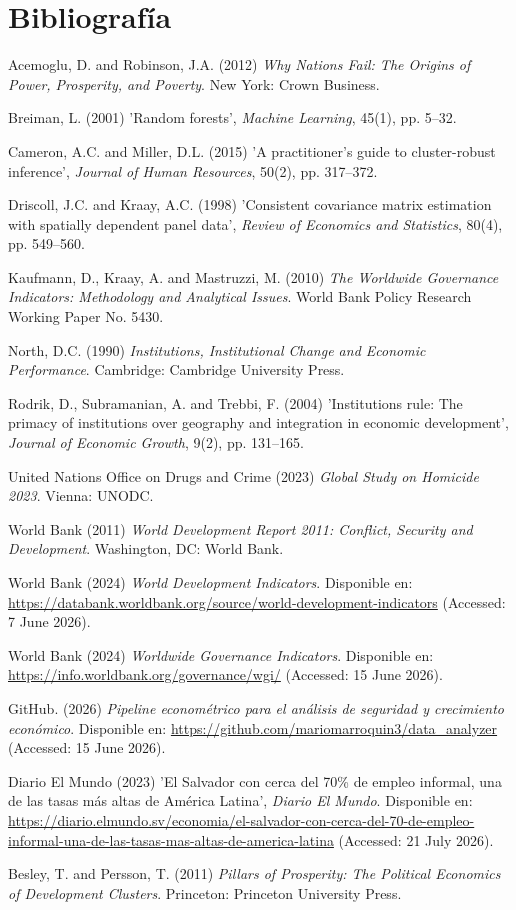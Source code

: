 \documentclass[11pt,a4paper]{article}
\begin{document}
\section*{Bibliografía}

Acemoglu, D. and Robinson, J.A. (2012) \textit{Why Nations Fail: The Origins of Power, Prosperity, and Poverty}. New York: Crown Business.

Breiman, L. (2001) 'Random forests', \textit{Machine Learning}, 45(1), pp. 5--32.

Cameron, A.C. and Miller, D.L. (2015) 'A practitioner's guide to cluster-robust inference', \textit{Journal of Human Resources}, 50(2), pp. 317--372.

Driscoll, J.C. and Kraay, A.C. (1998) 'Consistent covariance matrix estimation with spatially dependent panel data', \textit{Review of Economics and Statistics}, 80(4), pp. 549--560.

Kaufmann, D., Kraay, A. and Mastruzzi, M. (2010) \textit{The Worldwide Governance Indicators: Methodology and Analytical Issues}. World Bank Policy Research Working Paper No. 5430.

North, D.C. (1990) \textit{Institutions, Institutional Change and Economic Performance}. Cambridge: Cambridge University Press.

Rodrik, D., Subramanian, A. and Trebbi, F. (2004) 'Institutions rule: The primacy of institutions over geography and integration in economic development', \textit{Journal of Economic Growth}, 9(2), pp. 131--165.

United Nations Office on Drugs and Crime (2023) \textit{Global Study on Homicide 2023}. Vienna: UNODC.

World Bank (2011) \textit{World Development Report 2011: Conflict, Security and Development}. Washington, DC: World Bank.

World Bank (2024) \textit{World Development Indicators}. Disponible en:
\url{https://databank.worldbank.org/source/world-development-indicators}
(Accessed: 7 June 2026).

World Bank (2024) \textit{Worldwide Governance Indicators}. Disponible en:
\url{https://info.worldbank.org/governance/wgi/}
(Accessed: 15 June 2026).

GitHub. (2026) \textit{Pipeline econométrico para el análisis de seguridad y crecimiento económico}. Disponible en:
\url{https://github.com/mariomarroquin3/data_analyzer}
(Accessed: 15 June 2026).

Diario El Mundo (2023) 'El Salvador con cerca del 70\% de empleo informal, una de las tasas más altas de América Latina', \textit{Diario El Mundo}. Disponible en: \url {https://diario.elmundo.sv/economia/el-salvador-con-cerca-del-70-de-empleo-informal-una-de-las-tasas-mas-altas-de-america-latina} (Accessed: 21 July 2026).

Besley, T. and Persson, T. (2011) \textit{Pillars of Prosperity: The Political Economics of Development Clusters}. Princeton: Princeton University Press.
\end{document}
